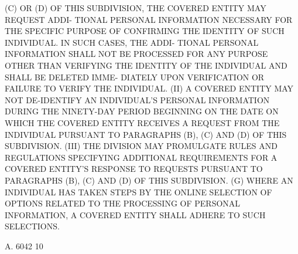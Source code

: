  (C)  OR  (D)  OF  THIS SUBDIVISION, THE COVERED ENTITY MAY REQUEST ADDI-
 TIONAL PERSONAL  INFORMATION  NECESSARY  FOR  THE  SPECIFIC  PURPOSE  OF
 CONFIRMING  THE  IDENTITY  OF  SUCH INDIVIDUAL. IN SUCH CASES, THE ADDI-
 TIONAL PERSONAL INFORMATION SHALL NOT BE PROCESSED FOR ANY PURPOSE OTHER
 THAN VERIFYING THE IDENTITY OF THE INDIVIDUAL AND SHALL BE DELETED IMME-
 DIATELY UPON VERIFICATION OR FAILURE TO VERIFY THE INDIVIDUAL.
   (II) A COVERED ENTITY MAY NOT  DE-IDENTIFY  AN  INDIVIDUAL'S  PERSONAL
 INFORMATION  DURING THE NINETY-DAY PERIOD BEGINNING ON THE DATE ON WHICH
 THE COVERED ENTITY RECEIVES A REQUEST FROM THE  INDIVIDUAL  PURSUANT  TO
 PARAGRAPHS (B), (C) AND (D) OF THIS SUBDIVISION.
   (III)  THE  DIVISION  MAY  PROMULGATE RULES AND REGULATIONS SPECIFYING
 ADDITIONAL REQUIREMENTS FOR A  COVERED  ENTITY'S  RESPONSE  TO  REQUESTS
 PURSUANT TO PARAGRAPHS (B), (C) AND (D) OF THIS SUBDIVISION.
   (G)  WHERE  AN  INDIVIDUAL  HAS TAKEN STEPS BY THE ONLINE SELECTION OF
 OPTIONS RELATED TO THE PROCESSING OF  PERSONAL  INFORMATION,  A  COVERED
 ENTITY SHALL ADHERE TO SUCH SELECTIONS.

 A. 6042                            10
 
